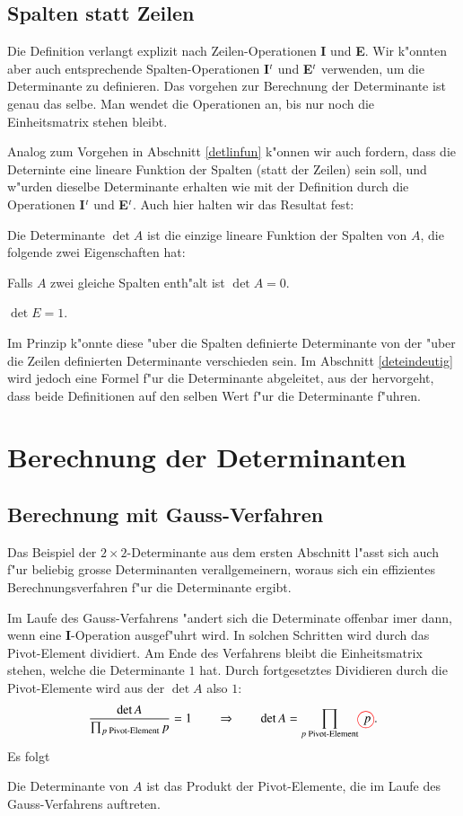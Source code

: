 \subsection{Spalten statt Zeilen}
Die Definition verlangt explizit nach Zeilen-Operationen {\bf I}
und {\bf E}. Wir k"onnten aber auch entsprechende Spalten-Operationen
{\bf I$\mathstrut^t$}
und
{\bf E$\mathstrut^t$}
verwenden, um die Determinante zu definieren. Das vorgehen zur Berechnung
der Determinante ist genau das selbe. Man wendet die Operationen an, bis
nur noch die Einheitsmatrix stehen bleibt.

Analog zum Vorgehen in Abschnitt \ref{detlinfun} k"onnen wir auch
fordern, dass die Deterninte eine lineare Funktion der Spalten
(statt der Zeilen) sein soll, und w"urden dieselbe Determinante
erhalten wie mit der Definition durch die Operationen 
{\bf I$\mathstrut^t$}
und
{\bf E$\mathstrut^t$}.
Auch hier halten wir das Resultat fest:
\begin{satz}
Die Determinante
$\det A$ ist die einzige lineare Funktion der Spalten von $A$, die folgende
zwei Eigenschaften hat:
\begin{compactenum}
\item Falls $A$ zwei gleiche Spalten enth"alt ist $\det A=0$.
\item $\det E = 1$.
\end{compactenum}
\end{satz}
Im Prinzip k"onnte diese "uber die Spalten definierte Determinante
von der "uber die Zeilen definierten Determinante verschieden sein.
Im Abschnitt \ref{deteindeutig} wird jedoch eine Formel f"ur die
Determinante abgeleitet, aus der hervorgeht, dass beide Definitionen
auf den selben Wert f"ur die Determinante f"uhren.

\section{Berechnung der Determinanten}
\subsection{Berechnung mit Gauss-Verfahren}
Das Beispiel der $2\times 2$-Determinante aus dem ersten Abschnitt
l"asst sich auch f"ur beliebig grosse Determinanten verallgemeinern,
woraus sich ein effizientes Berechnungsverfahren f"ur die Determinante
ergibt.

Im Laufe des Gauss-Verfahrens "andert sich die Determinate offenbar
imer dann, wenn eine {\bf I}-Operation ausgef"uhrt wird. In solchen
Schritten wird durch das Pivot-Element dividiert. Am Ende des 
Verfahrens bleibt die Einheitsmatrix stehen, welche die Determinante
$1$ hat. Durch fortgesetztes Dividieren durch die Pivot-Elemente wird
aus der $\det A$ also $1$:
\[
\frac{\det A}{\prod_{\text{$p$ Pivot-Element} }p}=1\qquad\Rightarrow
\qquad
\det A=\prod_{\text{$p$ Pivot-Element}} p%
\begin{picture}(0,0)
\color{red}\put(-4,2){\circle{13}}
\end{picture}%
\;.
\]
Es folgt
\begin{satz}
\label{detprodpivot}
Die Determinante von $A$ ist das Produkt der Pivot-Elemente,
die im Laufe des Gauss-Verfahrens auftreten.
\end{satz}

